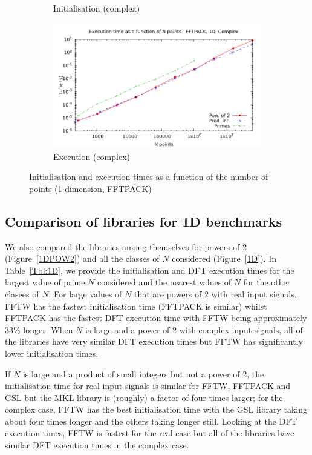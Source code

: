 \documentclass[12pt, a4paper]{article} \setlength{\textheight}{24cm}
\begin{document}
\begin{figure}[H]
\begin{subfigure}{.5\textwidth}
    \caption{Initialisation (complex)}
    \label{1DFFTPACKCI}
  \end{subfigure}%
  \begin{subfigure}{.5\textwidth}
    \centering
    \includegraphics[width=.9\linewidth]{graphs/1d-fftpack-exec-c.pdf}
    \caption{Execution (complex)}
    \label{1DFFTPACKC}
  \end{subfigure}
  \caption{Initialisation and execution times as a function of the
    number of points (1 dimension, FFTPACK)}
  \label{1DFFTPACK}
\end{figure}


\subsection{Comparison of libraries for 1D benchmarks}\label{Sec:ALL1d}
We also compared the libraries among themselves for powers of 2
(Figure~\ref{1DPOW2}) and all the classes of $N$ considered
(Figure~\ref{1D}). In Table~\ref{Tbl:1D}, we provide the initialisation
and DFT execution times for the largest value of prime $N$ considered
and the nearest values of $N$ for the other clasees of $N.$ For large
values of $N$ that are powers of 2 with real input signals, FFTW has
the fastest initialisation time (FFTPACK is similar) whilst FFTPACK
has the fastest DFT execution time with FFTW being approximately 33\%
longer. When $N$ is large and a power of 2 with complex input signals,
all of the libraries have very similar DFT execution times but FFTW
has significantly lower initialisation times.

If $N$ is large and a product of small integers but not a power of 2,
the initialisation time for real input signals is similar for FFTW,
FFTPACK and GSL but the MKL library is (roughly) a factor of four
times larger; for the complex case, FFTW has the best initialisation
time with the GSL library taking about four times longer and the
others taking longer still. Looking at the DFT execution times, FFTW
is fastest for the real case but all of the libraries have similar DFT
execution times in the complex case.
\end{document}
